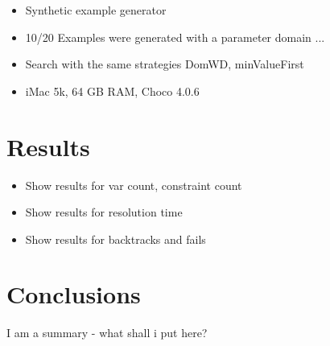 \documentclass[english,biblatex]{lni}
\begin{document}
\begin{itemize}
\item Synthetic example generator 
\item 10/20 Examples were generated with a parameter domain ...
\item Search with the same strategies DomWD, minValueFirst
\item iMac 5k, 64 GB RAM, Choco 4.0.6
\end{itemize}

\section{Results}

\begin{itemize}
\item Show results for var count, constraint count
\item Show results for resolution time
\item Show results for backtracks and fails
\end{itemize}

\section{Conclusions}

I am a summary - what shall i put here?

\printbibliography[heading=bibintoc]
\end{document}
